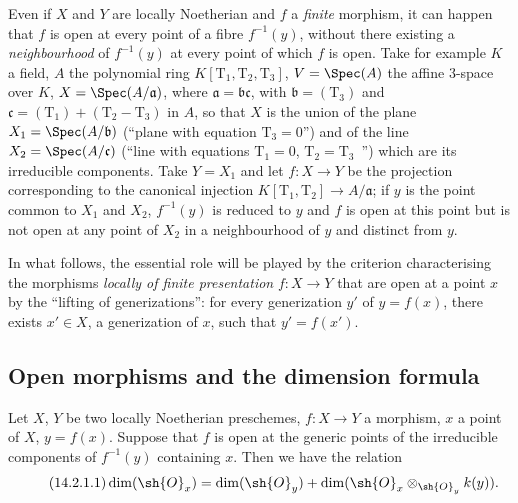 \begin{remark}[14.1.5]
\label{IV.14.1.5}
Even if $X$ and $Y$ are locally Noetherian and $f$ a \emph{finite} morphism, it can happen that $f$ is open at every point of a fibre $f^{-1}(y)$, without there existing a \emph{neighbourhood} of $f^{-1}(y)$ at every point of which $f$ is open.
Take for example $K$ a field, $A$ the polynomial ring $K[\mathrm{T}_1,\mathrm{T}_2,\mathrm{T}_3]$, $V=\Spec(A)$ the affine $3$-space over $K$, $X=\Spec(A/\mathfrak{a})$, where $\mathfrak{a}=\mathfrak{b}\mathfrak{c}$, with $\mathfrak{b}=(\mathrm{T}_3)$ and $\mathfrak{c}=(\mathrm{T}_1)+(\mathrm{T}_2-\mathrm{T}_3)$ in $A$, so that $X$ is the union of the plane $X_1=\Spec(A/\mathfrak{b})$ (``plane with equation $\mathrm{T}_3=0$'') and of the line $X_2=\Spec(A/\mathfrak{c})$ (``line with equations $\mathrm{T}_1=0$, $\mathrm{T}_2=\mathrm{T}_3$~'') which are its irreducible components.
Take $Y=X_1$ and let $f:X\to Y$ be the projection corresponding to the canonical injection $K[\mathrm{T}_1,\mathrm{T}_2]\to A/\mathfrak{a}$; if $y$ is the point common to $X_1$ and $X_2$, $f^{-1}(y)$ is reduced to $y$ and $f$ is open at this point but is not open at any point of $X_2$ in a neighbourhood of $y$ and distinct from $y$.
\end{remark}

\begin{env}[14.1.6]
\label{IV.14.1.6}
In what follows, the essential role will be played by the criterion  characterising the morphisms \emph{locally of finite presentation} $f:X\to Y$ that are open at a point $x$ by the ``lifting of generizations'': for every generization $y'$ of $y=f(x)$, there exists $x'\in X$, a generization of $x$, such that $y'=f(x')$.
\end{env}

\subsection{Open morphisms and the dimension formula}
\label{subsection:IV.14.2}

\begin{theorem}[14.2.1]
\label{IV.14.2.1}
Let $X$, $Y$ be two locally Noetherian preschemes, $f:X\to Y$ a morphism, $x$ a point of $X$, $y=f(x)$.
Suppose that $f$ is open at the generic points of the irreducible components of $f^{-1}(y)$ containing $x$.
Then we have the relation
\begin{equation}
\tag{14.2.1.1}
\label{IV.14.2.1.1}
  \dim(\sh{O}_x)=\dim(\sh{O}_y)+\dim(\sh{O}_x\otimes_{\sh{O}_y}k(y)).
\end{equation}
\end{theorem}

